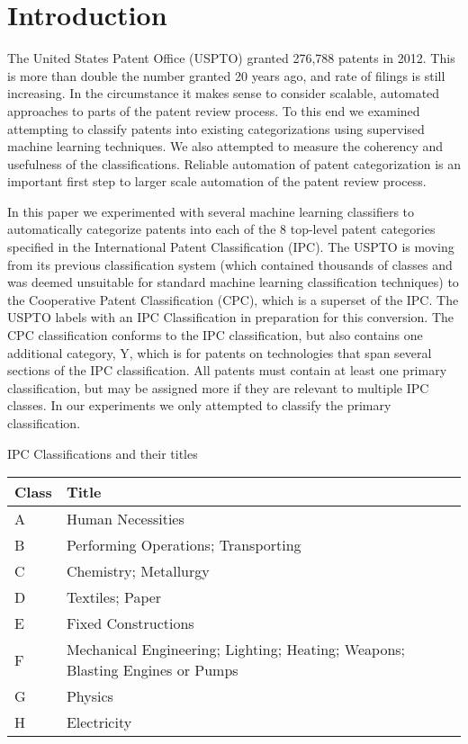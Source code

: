 \section{Introduction}
\indent
The United States Patent Office (USPTO) granted 276,788 patents in 2012\cite{USPTO:2013:stats}. This is more than double the number granted 20 years ago, and rate of filings is still increasing. In the circumstance it makes sense to consider scalable, automated approaches to parts of the patent review process. To this end we examined attempting to classify patents into existing categorizations using supervised machine learning techniques. We also attempted to measure the coherency and usefulness of the classifications. Reliable automation of patent categorization is an important first step to larger scale automation of the patent review process.

In this paper we experimented with several machine learning classifiers to automatically categorize patents into each of the 8 top-level patent categories specified in the International Patent Classification\cite{ipc:2013:guide} (IPC). The USPTO is moving from its previous classification system (which contained thousands of classes and was deemed unsuitable for standard machine learning classification techniques) to the Cooperative Patent Classification (CPC), which is a superset of the IPC. The USPTO labels with an IPC Classification in preparation for this conversion. The CPC classification conforms to the IPC classification, but also contains one additional category, Y, which is for patents on technologies that span several sections of the IPC classification. All patents must contain at least one primary classification, but may be assigned more if they are relevant to multiple IPC classes. In our experiments we only attempted to classify the primary classification.



\begin{tablehere}
	\centering
	\caption{IPC Classifications and their titles}
	\begin{tabular}{ | l | l |}
		\hline
		\textbf{Class} & \textbf{Title} \\
				\hline
		A & Human Necessities \\
				\hline
		B & Performing Operations; Transporting \\
				\hline
		C & Chemistry; Metallurgy \\
				\hline
		D & Textiles; Paper \\
				\hline
		E & Fixed Constructions \\
				\hline
		F & Mechanical Engineering; Lighting; Heating; Weapons; Blasting Engines or Pumps \\
		\hline
		G & Physics \\
				\hline
		H & Electricity \\
				\hline
	\end{tabular}
	
\end{tablehere}



